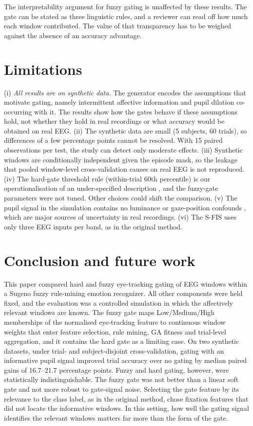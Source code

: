 \documentclass[11pt,a4paper]{article}
\begin{document}
The interpretability argument for fuzzy gating is unaffected by these results. The gate can be stated as three linguistic rules, and a reviewer can read off how much each window contributed. The value of that transparency has to be weighed against the absence of an accuracy advantage.

\section{Limitations}
\label{sec:limits}
(i) \emph{All results are on synthetic data.} The generator encodes the assumptions that motivate gating, namely intermittent affective information and pupil dilation co-occurring with it. The results show how the gates behave if these assumptions hold, not whether they hold in real recordings or what accuracy would be obtained on real EEG. (ii) The synthetic data are small (5 subjects, 60 trials), so differences of a few percentage points cannot be resolved. With 15 paired observations per test, the study can detect only moderate effects. (iii) Synthetic windows are conditionally independent given the episode mask, so the leakage that pooled window-level cross-validation causes on real EEG is not reproduced. (iv) The hard-gate threshold rule (within-trial 60th percentile) is our operationalisation of an under-specified description \cite{FarhadiSedehi2024a}, and the fuzzy-gate parameters were not tuned. Other choices could shift the comparison. (v) The pupil signal in the simulation contains no luminance or gaze-position confounds \cite{Mathot2018,Raiturkar2016}, which are major sources of uncertainty in real recordings. (vi) The S-FIS uses only three EEG inputs per band, as in the original method.

\section{Conclusion and future work}
\label{sec:conclusion}
This paper compared hard and fuzzy eye-tracking gating of EEG windows within a Sugeno fuzzy rule-mining emotion recognizer. All other components were held fixed, and the evaluation was a controlled simulation in which the affectively relevant windows are known. The fuzzy gate maps Low/Medium/High memberships of the normalised eye-tracking feature to continuous window weights that enter feature selection, rule mining, GA fitness and trial-level aggregation, and it contains the hard gate as a limiting case. On two synthetic datasets, under trial- and subject-disjoint cross-validation, gating with an informative pupil signal improved trial accuracy over no gating by median paired gains of 16.7--21.7 percentage points. Fuzzy and hard gating, however, were statistically indistinguishable. The fuzzy gate was not better than a linear soft gate and not more robust to gate-signal noise. Selecting the gate feature by its relevance to the class label, as in the original method, chose fixation features that did not locate the informative windows. In this setting, how well the gating signal identifies the relevant windows matters far more than the form of the gate.
\end{document}
